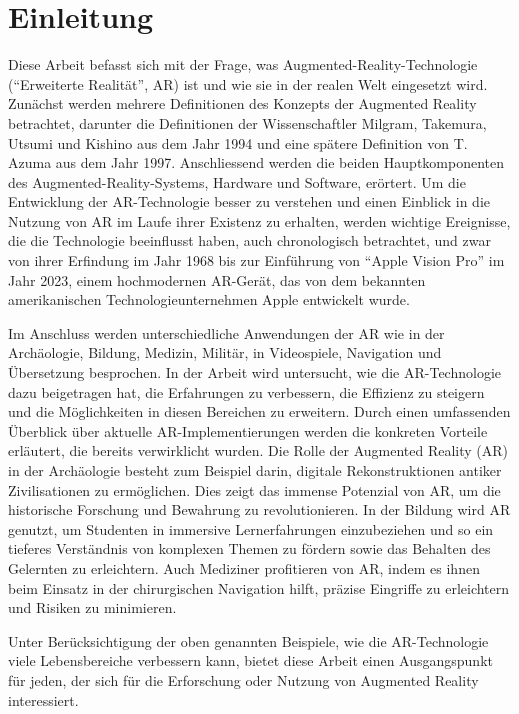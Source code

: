 \section{Einleitung}

Diese Arbeit befasst sich mit der Frage, was Augmented-Reality-Technologie (“Erweiterte Realität”, AR) ist und wie sie in der realen Welt eingesetzt wird. Zunächst werden mehrere Definitionen des Konzepts der Augmented Reality betrachtet, darunter die Definitionen der Wissenschaftler Milgram, Takemura, Utsumi und Kishino aus dem Jahr 1994 und eine spätere Definition von T. Azuma aus dem Jahr 1997. Anschliessend werden die beiden Hauptkomponenten des Augmented-Reality-Systems, Hardware und Software, erörtert. Um die Entwicklung der AR-Technologie besser zu verstehen und einen Einblick in die Nutzung von AR im Laufe ihrer Existenz zu erhalten, werden wichtige Ereignisse, die die Technologie beeinflusst haben, auch chronologisch betrachtet, und zwar von ihrer Erfindung im Jahr 1968 bis zur Einführung von “Apple Vision Pro” im Jahr 2023, einem hochmodernen AR-Gerät, das von dem bekannten amerikanischen Technologieunternehmen Apple entwickelt wurde. \cite{Apple}   

Im Anschluss werden unterschiedliche Anwendungen der AR wie in der Archäologie, Bildung, Medizin, Militär, in Videospiele, Navigation und Übersetzung besprochen. In der Arbeit wird untersucht, wie die AR-Technologie dazu beigetragen hat, die Erfahrungen zu verbessern, die Effizienz zu steigern und die Möglichkeiten in diesen Bereichen zu erweitern. Durch einen umfassenden Überblick über aktuelle AR-Implementierungen werden die konkreten Vorteile erläutert, die bereits verwirklicht wurden. Die Rolle der Augmented Reality (AR) in der Archäologie besteht zum Beispiel darin, digitale Rekonstruktionen antiker Zivilisationen zu ermöglichen. Dies zeigt das immense Potenzial von AR, um die historische Forschung und Bewahrung zu revolutionieren. In der Bildung wird AR genutzt, um Studenten in immersive Lernerfahrungen einzubeziehen und so ein tieferes Verständnis von komplexen Themen zu fördern sowie das Behalten des Gelernten zu erleichtern. Auch Mediziner profitieren von AR, indem es ihnen beim Einsatz in der chirurgischen Navigation hilft, präzise Eingriffe zu erleichtern und Risiken zu minimieren.

Unter Berücksichtigung der oben genannten Beispiele, wie die AR-Technologie viele Lebensbereiche verbessern kann, bietet diese Arbeit einen Ausgangspunkt für jeden, der sich für die Erforschung oder Nutzung von Augmented Reality interessiert.

